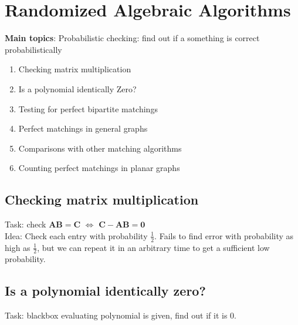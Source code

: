\section{Randomized Algebraic Algorithms}

\textbf{Main topics}: Probabilistic checking: find out if a something is correct probabilistically

\begin{tcolorbox}[title=Sections, colback=blue!10, colframe=blue]
    \begin{enumerate}
        \item Checking matrix multiplication
        \item Is a polynomial identically Zero?
        \item Testing for perfect bipartite matchings
        \item Perfect matchings in general graphs
        \item Comparisons with other matching algorithms
        \item Counting perfect matchings in planar graphs
    \end{enumerate}
\end{tcolorbox}


\subsection{Checking matrix multiplication}

Task: check $\mathbf{A}\mathbf{B}=\mathbf{C}$ $\Leftrightarrow$ $\mathbf{C}-\mathbf{A}\mathbf{B} = \mathbf{0}$ \\
Idea: Check each entry with probability $\frac{1}{2}$. Fails to find error with probability as high as $\frac{1}{2}$, but we can repeat it in an arbitrary time to get a sufficient low probability.

\subsection{Is a polynomial identically zero?}
Task: blackbox evaluating polynomial is given, find out if it is 0.

\begin{theorem}
    
\end{theorem}

\newpage
